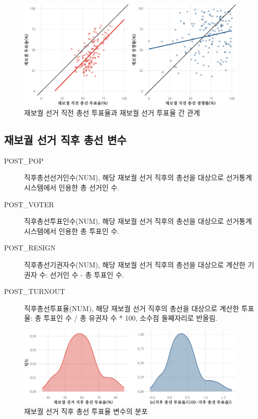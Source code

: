 \documentclass[
  11pt,
  letter]{article}
\begin{document}
\begin{figure}
\centering
\includegraphics{Codebook_national_files/figure-latex/unnamed-chunk-15-1.pdf}
\caption{재보궐 선거 직전 총선 투표율과 재보궐 선거 투표율 간 관계}
\end{figure}

\newpage

\hypertarget{uxc7acuxbcf4uxad90-uxc120uxac70-uxc9c1uxd6c4-uxcd1duxc120-uxbcc0uxc218}{%
\subsection{재보궐 선거 직후 총선
변수}\label{uxc7acuxbcf4uxad90-uxc120uxac70-uxc9c1uxd6c4-uxcd1duxc120-uxbcc0uxc218}}

\begin{description}
\item[POST\_POP]
직후총선선거인수(NUM), 해당 재보궐 선거 직후의 총선을 대상으로
선거통계시스템에서 인용한 총 선거인 수.
\item[POST\_VOTER]
직후총선투표인수(NUM), 해당 재보궐 선거 직후의 총선을 대상으로
선거통계시스템에서 인용한 총 투표인 수.
\item[POST\_RESIGN]
직후총선기권자수(NUM), 해당 재보궐 선거 직후의 총선을 대상으로 계산한
기권자 수: 선거인 수 - 총 투표인 수.
\item[POST\_TURNOUT]
직후총선투표율(NUM), 해당 재보궐 선거 직후의 총선을 대상으로 계산한
투표율: 총 투표인 수 / 총 유권자 수 * 100, 소수점 둘째자리로 반올림.
\end{description}

\begin{figure}
\centering
\includegraphics{Codebook_national_files/figure-latex/unnamed-chunk-16-1.pdf}
\caption{재보궐 선거 직후 총선 투표율 변수의 분포}
\end{figure}
\end{document}
